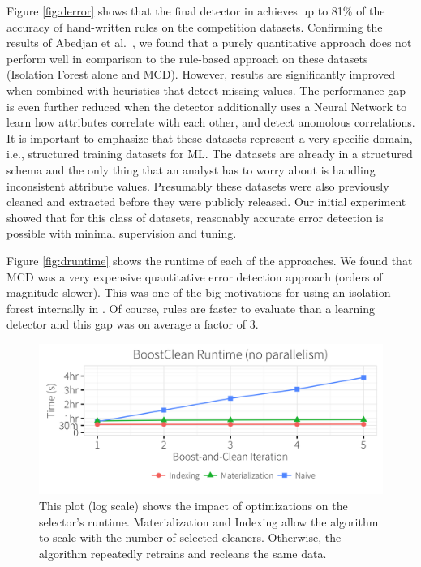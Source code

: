  Figure  \ref{fig:derror} shows that the final detector in \sys achieves up to 81\% of the accuracy of hand-written rules on the competition datasets.
Confirming the results of Abedjan et al.~\cite{DBLP:journals/pvldb/AbedjanCDFIOPST16}, we found that a 
purely quantitative approach does not perform well in comparison to the rule-based approach on these datasets (Isolation Forest alone and MCD).
However, results are significantly improved when combined with heuristics that detect missing values. 
The performance gap is even further reduced when the detector additionally uses a Neural Network to learn how attributes correlate with each other, and detect anomolous correlations.
It is important to emphasize that these datasets represent a very specific domain, i.e., structured training datasets for ML.
The datasets are already in a structured schema and the only thing that an analyst has to worry about is handling inconsistent attribute values.
Presumably these datasets were also previously cleaned and extracted before they were publicly released.
Our initial experiment showed that for this class of datasets, reasonably accurate error detection is possible with minimal supervision and tuning.

 Figure  \ref{fig:druntime} shows the runtime of each of the approaches.
 We found that MCD was a very expensive quantitative error detection approach (orders of magnitude slower).
 This was one of the big motivations for using an isolation forest internally in \sys.
 Of course, rules are faster to evaluate than a learning detector and this gap was on average a factor of 3.
 
 \begin{figure}[t]
\centering
 \includegraphics[width=0.9\columnwidth]{exp/opt1.png}
 \caption{This plot (log scale) shows the impact of optimizations on the selector's runtime. Materialization and Indexing allow the algorithm to scale with the number of selected cleaners. Otherwise, the algorithm repeatedly retrains and recleans the same data.
 \label{fig:opt}}
\end{figure}
 
